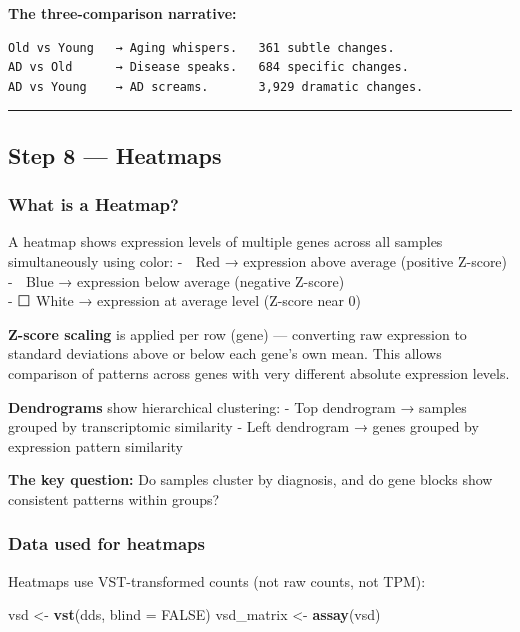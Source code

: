\documentclass[
]{article}
\newenvironment{Shaded}{\begin{snugshade}}{\end{snugshade}}
\newcommand{\AttributeTok}[1]{\textcolor[rgb]{0.13,0.29,0.53}{#1}}
\newcommand{\ConstantTok}[1]{\textcolor[rgb]{0.56,0.35,0.01}{#1}}
\newcommand{\FunctionTok}[1]{\textcolor[rgb]{0.13,0.29,0.53}{\textbf{#1}}}
\newcommand{\NormalTok}[1]{#1}
\newcommand{\OtherTok}[1]{\textcolor[rgb]{0.56,0.35,0.01}{#1}}
\begin{document}
\textbf{The three-comparison narrative:}

\begin{verbatim}
Old vs Young   → Aging whispers.   361 subtle changes.
AD vs Old      → Disease speaks.   684 specific changes.
AD vs Young    → AD screams.       3,929 dramatic changes.
\end{verbatim}

\begin{center}\rule{0.5\linewidth}{0.5pt}\end{center}

\subsection{Step 8 --- Heatmaps}\label{step-8-heatmaps}

\subsubsection{What is a Heatmap?}\label{what-is-a-heatmap}

A heatmap shows expression levels of multiple genes across all samples
simultaneously using color: - 🔴 Red → expression above average
(positive Z-score) - 🔵 Blue → expression below average (negative
Z-score)\\
- ⬜ White → expression at average level (Z-score near 0)

\textbf{Z-score scaling} is applied per row (gene) --- converting raw
expression to standard deviations above or below each gene's own mean.
This allows comparison of patterns across genes with very different
absolute expression levels.

\textbf{Dendrograms} show hierarchical clustering: - Top dendrogram →
samples grouped by transcriptomic similarity - Left dendrogram → genes
grouped by expression pattern similarity

\textbf{The key question:} Do samples cluster by diagnosis, and do gene
blocks show consistent patterns within groups?

\subsubsection{Data used for heatmaps}\label{data-used-for-heatmaps}

Heatmaps use VST-transformed counts (not raw counts, not TPM):

\begin{Shaded}
\begin{Highlighting}[]
\NormalTok{vsd }\OtherTok{\textless{}{-}} \FunctionTok{vst}\NormalTok{(dds, }\AttributeTok{blind =} \ConstantTok{FALSE}\NormalTok{)}
\NormalTok{vsd\_matrix }\OtherTok{\textless{}{-}} \FunctionTok{assay}\NormalTok{(vsd)}
\end{Highlighting}
\end{Shaded}
\end{document}
